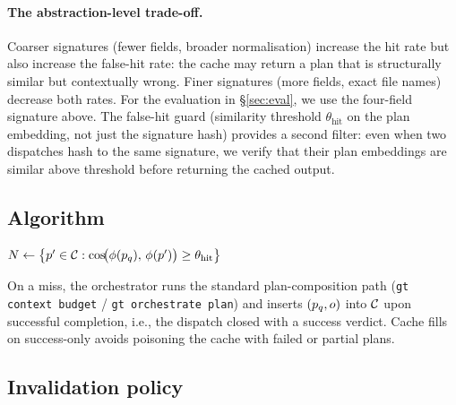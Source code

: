 \paragraph{The abstraction-level trade-off.}
Coarser signatures (fewer fields, broader normalisation) increase the
hit rate but also increase the false-hit rate: the cache may return a
plan that is structurally similar but contextually wrong.  Finer
signatures (more fields, exact file names) decrease both rates.  For
the evaluation in §\ref{sec:eval}, we use the four-field signature
above.  The false-hit guard (similarity threshold \(\theta_{\text{hit}}\)
on the plan embedding, not just the signature hash) provides a second
filter: even when two dispatches hash to the same signature, we verify
that their plan embeddings are similar above threshold before returning
the cached output.

\subsection{Algorithm}

\begin{algorithm}[H]
\SetAlgoLined
\DontPrintSemicolon
{}
\BlankLine
{}
$N \gets \bigl\{p' \in \mathcal{C} :
  \cos\!\bigl(\phi(p_q),\, \phi(p')\bigr) \geq \theta_{\text{hit}}\bigr\}$
\caption{Plan-cache lookup with exact-match and semantic fallback}
\label{alg:plancache}
\end{algorithm}

On a miss, the orchestrator runs the standard plan-composition path
(\texttt{gt context budget} / \texttt{gt orchestrate plan}) and inserts
\((p_q, o)\) into \(\mathcal{C}\) upon successful completion, i.e.,
the dispatch closed with a success verdict.  Cache fills on
success-only avoids poisoning the cache with failed or partial plans.

\subsection{Invalidation policy}

